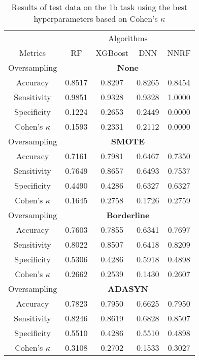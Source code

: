\begin{table}[!htb]
\centering
\caption{Results of test data on the 1b task using the best hyperparameters based on Cohen's $\kappa$}
\label{tab:1b_test_results}
\begin{tabular}{c | c c c c}
\hline
 & \multicolumn{4}{c}{Algorithms}\\ 
Metrics &RF & XGBoost & DNN & NNRF\\ 
\hline
Oversampling &\multicolumn{4}{|c}{\textbf{None}}\\ 
\hline
Accuracy & 0.8517 & 0.8297 & 0.8265 & 0.8454\\ 
Sensitivity & 0.9851 & 0.9328 & 0.9328 & 1.0000\\ 
Specificity & 0.1224 & 0.2653 & 0.2449 & 0.0000\\ 
Cohen's $\kappa$ & 0.1593 & 0.2331 & 0.2112 & 0.0000\\ 
\hline
Oversampling &\multicolumn{4}{|c}{\textbf{SMOTE}}\\ 
\hline
Accuracy & 0.7161 & 0.7981 & 0.6467 & 0.7350\\ 
Sensitivity & 0.7649 & 0.8657 & 0.6493 & 0.7537\\ 
Specificity & 0.4490 & 0.4286 & 0.6327 & 0.6327\\ 
Cohen's $\kappa$ & 0.1645 & 0.2758 & 0.1726 & 0.2759\\ 
\hline
Oversampling &\multicolumn{4}{|c}{\textbf{Borderline}}\\ 
\hline
Accuracy & 0.7603 & 0.7855 & 0.6341 & 0.7697\\ 
Sensitivity & 0.8022 & 0.8507 & 0.6418 & 0.8209\\ 
Specificity & 0.5306 & 0.4286 & 0.5918 & 0.4898\\ 
Cohen's $\kappa$ & 0.2662 & 0.2539 & 0.1430 & 0.2607\\ 
\hline
Oversampling &\multicolumn{4}{|c}{\textbf{ADASYN}}\\ 
\hline
Accuracy & 0.7823 & 0.7950 & 0.6625 & 0.7950\\ 
Sensitivity & 0.8246 & 0.8619 & 0.6828 & 0.8507\\ 
Specificity & 0.5510 & 0.4286 & 0.5510 & 0.4898\\ 
Cohen's $\kappa$ & 0.3108 & 0.2702 & 0.1533 & 0.3027\\ 
\hline
\end{tabular}
\end{table}


